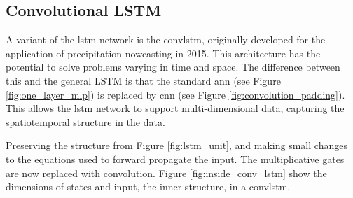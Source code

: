 \clearpage
\subsection{Convolutional LSTM}  \label{sec:convolutional_lstm}
A variant of the \acrshort{lstm} network is the \acrfull{convlstm}, originally developed for the application of precipitation nowcasting in 2015. This architecture has the potential to solve problems varying in time and space. The difference between this and the general LSTM is that the standard \acrshort{ann} (see Figure \ref{fig:one_layer_mlp}) is replaced by \acrshort{cnn} (see Figure \ref{fig:convolution_padding}). This allows the \acrshort{lstm} network to support multi-dimensional data, capturing the spatiotemporal structure in the data. 


Preserving the structure from Figure \ref{fig:lstm_unit}, and making small changes to the equations used to forward propagate the input. The multiplicative gates are now replaced with convolution. 
Figure \ref{fig:inside_conv_lstm} show the dimensions of states and input, the inner structure, in a \acrshort{convlstm}. 


